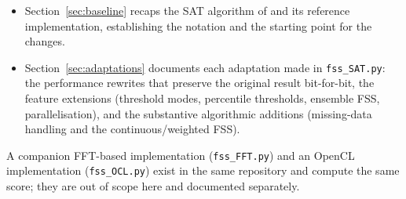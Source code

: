 \begin{itemize}
  \item Section~\ref{sec:baseline} recaps the SAT algorithm of
        \citet{faggian2015} and its reference implementation, establishing the
        notation and the starting point for the changes.
  \item Section~\ref{sec:adaptations} documents each adaptation made in
        \texttt{fss\_SAT.py}: the performance rewrites that preserve the
        original result bit-for-bit, the feature extensions (threshold modes,
        percentile thresholds, ensemble FSS, parallelisation), and the
        substantive algorithmic additions (missing-data handling and the
        continuous/weighted FSS).
\end{itemize}

A companion FFT-based implementation (\texttt{fss\_FFT.py}) and an OpenCL
implementation (\texttt{fss\_OCL.py}) exist in the same repository and compute
the same score; they are out of scope here and documented separately.
